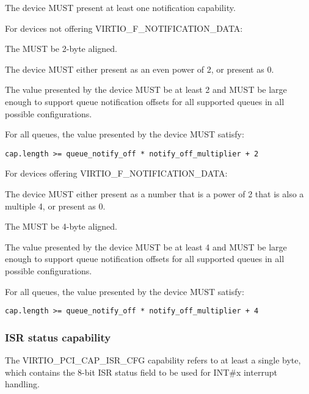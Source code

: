 The device MUST present at least one notification capability.

For devices not offering VIRTIO_F_NOTIFICATION_DATA:

The  MUST be 2-byte aligned.

The device MUST either present  as an even power of 2,
or present  as 0.

The value  presented by the device MUST be at least 2
and MUST be large enough to support queue notification offsets
for all supported queues in all possible configurations.

For all queues, the value  presented by the device MUST satisfy:
\begin{lstlisting}
cap.length >= queue_notify_off * notify_off_multiplier + 2
\end{lstlisting}

For devices offering VIRTIO_F_NOTIFICATION_DATA:

The device MUST either present  as a
number that is a power of 2 that is also a multiple 4,
or present  as 0.

The  MUST be 4-byte aligned.

The value  presented by the device MUST be at least 4
and MUST be large enough to support queue notification offsets
for all supported queues in all possible configurations.

For all queues, the value  presented by the device MUST satisfy:
\begin{lstlisting}
cap.length >= queue_notify_off * notify_off_multiplier + 4
\end{lstlisting}

\subsubsection{ISR status capability}\label{sec:Virtio Transport Options / Virtio Over PCI Bus / PCI Device Layout / ISR status capability}

The VIRTIO_PCI_CAP_ISR_CFG capability
refers to at least a single byte, which contains the 8-bit ISR status field
to be used for INT\#x interrupt handling.

